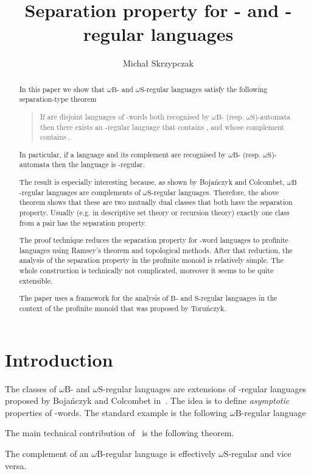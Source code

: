 \documentclass{LMCS}
\title
[Separation property for \wB- and \wS-regular languages]
{Separation property for \wB- and \wS-regular languages}
\author{Micha{\l} Skrzypczak}
\newcommand{\wB}{\ensuremath{\omega \mathrm{B}}\xspace}
\newcommand{\wS}{\ensuremath{\omega \mathrm{S}}\xspace}
\newcommand{\fB}{\ensuremath{\mathrm{B}}\xspace}
\newcommand{\fS}{\ensuremath{\mathrm{S}}\xspace}
\begin{document}
\begin{abstract}
\noindent In this paper we show that \wB- and \wS-regular languages satisfy the following separation-type theorem
\begin{quote}
If  are disjoint languages of -words both recognised
by \wB- (resp. \wS)-automata then there exists an -regular
language  that contains , and whose complement contains .
\end{quote}

In particular, if a language and its complement are recognised by \wB- (resp. \wS)-automata then the language is -regular.

The result is especially interesting because, as shown by Boja{\'n}czyk and Colcombet, \wB-regular languages are complements of \wS-regular languages. Therefore, the above theorem shows that these are two mutually dual classes that both have the separation property. Usually (e.g. in descriptive set theory or recursion theory) exactly one class from a pair  has the separation property.

The proof technique reduces the separation property for -word languages to profinite languages using Ramsey's theorem and topological methods. After that reduction, the analysis of the separation property in the profinite monoid is relatively simple. The whole construction is technically not complicated, moreover it seems to be quite extensible.

The paper uses a framework for the analysis of \fB- and \fS-regular languages in the context of the profinite monoid that was proposed by Toru{\'n}czyk.
\end{abstract}

\maketitle



\section{Introduction}

The classes of \wB- and \wS-regular languages are extensions of -regular languages proposed by Boja{\'n}czyk and Colcombet in~\cite{bojanczyk_bounds}. The idea is to define \emph{asymptotic} properties of -words. The standard example is the following \wB-regular language


The main technical contribution of~\cite{bojanczyk_bounds} is the following theorem.
\begin{theorem}\label{th:duality}
The complement of an \wB-regular language is effectively \wS-regular and vice versa.
\end{theorem}
\end{document}
